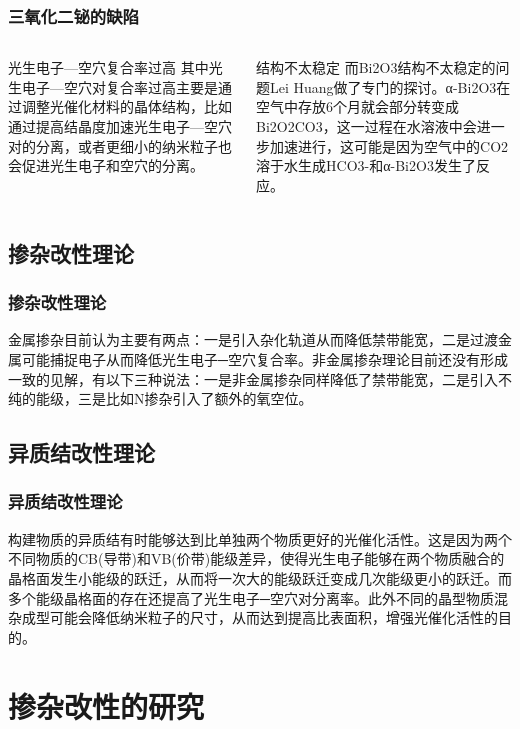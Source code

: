 \documentclass[xetex,compress]{mybeamer}
\begin{document}
\begin{frame}
\frametitle{三氧化二铋的缺陷}
\begin{columns}
\begin{block}{光生电子—空穴复合率过高}
其中光生电子—空穴对复合率过高主要是通过调整光催化材料的晶体结构，比如通过提高结晶度加速光生电子—空穴对的分离，或者更细小的纳米粒子也会促进光生电子和空穴的分离。
\end{block}
\begin{block}{结构不太稳定}
而Bi2O3结构不太稳定的问题Lei Huang做了专门的探讨。α-Bi2O3在空气中存放6个月就会部分转变成Bi2O2CO3，这一过程在水溶液中会进一步加速进行，这可能是因为空气中的CO2溶于水生成HCO3-和α-Bi2O3发生了反应。
\end{block}
\end{columns}
\end{frame}


\subsection{掺杂改性理论}
\begin{frame}
\frametitle{掺杂改性理论}
\begin{block}{}
金属掺杂目前认为主要有两点：一是引入杂化轨道从而降低禁带能宽，二是过渡金属可能捕捉电子从而降低光生电子─空穴复合率。非金属掺杂理论目前还没有形成一致的见解，有以下三种说法：一是非金属掺杂同样降低了禁带能宽，二是引入不纯的能级，三是比如N掺杂引入了额外的氧空位。
\end{block}
\end{frame}

\subsection{异质结改性理论}
\begin{frame}
\frametitle{异质结改性理论}
\begin{block}{}
构建物质的异质结有时能够达到比单独两个物质更好的光催化活性。这是因为两个不同物质的CB(导带)和VB(价带)能级差异，使得光生电子能够在两个物质融合的晶格面发生小能级的跃迁，从而将一次大的能级跃迁变成几次能级更小的跃迁。而多个能级晶格面的存在还提高了光生电子─空穴对分离率。此外不同的晶型物质混杂成型可能会降低纳米粒子的尺寸，从而达到提高比表面积，增强光催化活性的目的。
\end{block}
\end{frame}

\section{掺杂改性的研究}
\end{document}
